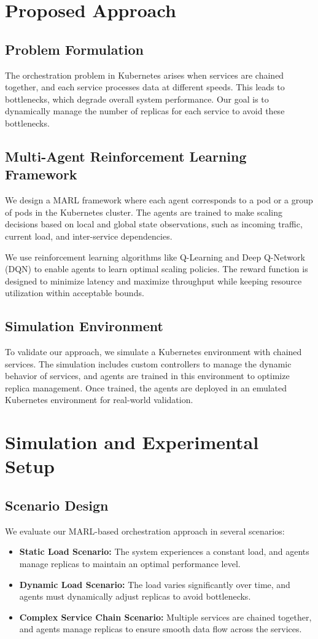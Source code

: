 \documentclass[conference]{IEEEtran}
\begin{document}
\section{Proposed Approach}
\subsection{Problem Formulation}
The orchestration problem in Kubernetes arises when services are chained together, and each service processes data at different speeds. This leads to bottlenecks, which degrade overall system performance. Our goal is to dynamically manage the number of replicas for each service to avoid these bottlenecks.

\subsection{Multi-Agent Reinforcement Learning Framework}
We design a MARL framework where each agent corresponds to a pod or a group of pods in the Kubernetes cluster. The agents are trained to make scaling decisions based on local and global state observations, such as incoming traffic, current load, and inter-service dependencies. 

We use reinforcement learning algorithms like Q-Learning and Deep Q-Network (DQN) to enable agents to learn optimal scaling policies. The reward function is designed to minimize latency and maximize throughput while keeping resource utilization within acceptable bounds.

\subsection{Simulation Environment}
To validate our approach, we simulate a Kubernetes environment with chained services. The simulation includes custom controllers to manage the dynamic behavior of services, and agents are trained in this environment to optimize replica management. Once trained, the agents are deployed in an emulated Kubernetes environment for real-world validation.

\section{Simulation and Experimental Setup}
\subsection{Scenario Design}
We evaluate our MARL-based orchestration approach in several scenarios:
\begin{itemize}
    \item \textbf{Static Load Scenario:} The system experiences a constant load, and agents manage replicas to maintain an optimal performance level.
    \item \textbf{Dynamic Load Scenario:} The load varies significantly over time, and agents must dynamically adjust replicas to avoid bottlenecks.
    \item \textbf{Complex Service Chain Scenario:} Multiple services are chained together, and agents manage replicas to ensure smooth data flow across the services.
\end{itemize}
\end{document}

